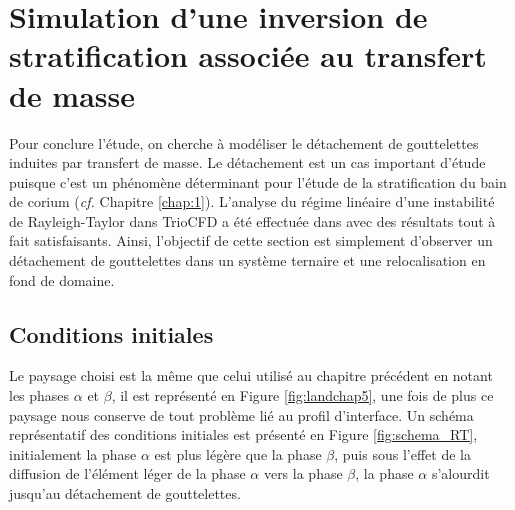 \chapter{Simulation d'une inversion de stratification associée au transfert de masse}

Pour conclure l'étude, on cherche à modéliser le détachement de gouttelettes induites par transfert de masse. Le détachement est un cas important d'étude puisque c'est un phénomène déterminant pour l'étude de la stratification du bain de corium (\textit{cf.} Chapitre \ref{chap:1}). L'analyse du régime linéaire d'une instabilité de Rayleigh-Taylor dans TrioCFD a été effectuée dans \cite{rasolofomanana_modelisation_nodate} avec des résultats tout à fait satisfaisants. Ainsi, l'objectif de cette section est simplement d'observer un détachement de gouttelettes dans un système ternaire et une relocalisation en fond de domaine.
\section{Conditions initiales}
Le paysage choisi est la même que celui utilisé au chapitre précédent en notant les phases $\alpha$ et $\beta$, il est représenté en Figure \ref{fig:landchap5}, une fois de plus ce paysage nous conserve de tout problème lié au profil d'interface. Un schéma représentatif des conditions initiales est présenté en Figure \ref{fig:schema_RT}, initialement la phase $\alpha$ est plus légère que la phase $\beta$, puis sous l'effet de la diffusion de l'élément léger de la phase $\alpha$ vers la phase $\beta$, la phase $\alpha$ s'alourdit jusqu'au détachement de gouttelettes.	

